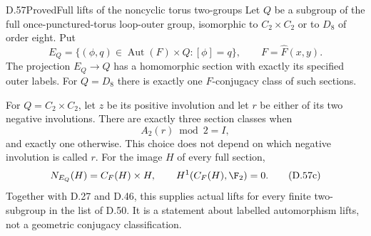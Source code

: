 \begin{claim}{D.57}{Proved}{Full lifts of the noncyclic torus two-groups}
Let $Q$ be a subgroup of the full
once-punctured-torus loop-outer group,
isomorphic to $C_2\times C_2$ or to
$D_8$ of order eight.  Put
\[
 E_Q=\{(\phi,q)\in\operatorname{Aut}(F)\times Q:
                        [\phi]=q\},\qquad F=\widehat F(x,y).
                                                               \tag{D.57a}
\]
The projection $E_Q\to Q$ has a homomorphic
section with exactly its specified outer labels.
For $Q=D_8$ there is exactly one
$F$-conjugacy class of such sections.

For $Q=C_2\times C_2$, let $z$ be its
positive involution and let $r$ be either
of its two negative involutions.  There
are exactly three section classes when
\[
                         A_2(r)\bmod2=I,                \tag{D.57b}
\]
and exactly one otherwise.  This choice
does not depend on which negative
involution is called $r$.
For the image $H$ of every full section,
\[
                  N_{E_Q}(H)=C_F(H)\times H,
                  \qquad H^1(C_F(H),\F_2)=0.            \tag{D.57c}
\]
Together with D.27 and D.46, this supplies
actual lifts for every finite two-subgroup
in the list of D.50.  It is a statement
about labelled automorphism lifts, not
a geometric conjugacy classification.
\end{claim}
